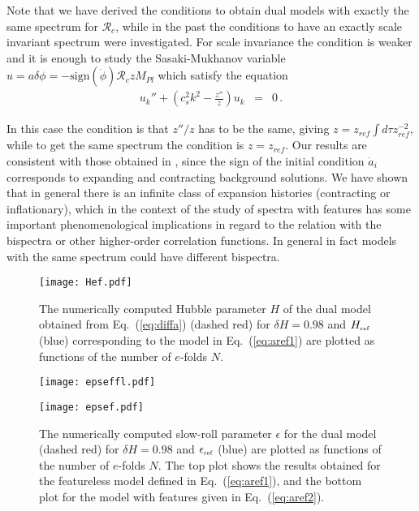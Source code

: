 \documentclass[aps,prl,amsmath,nofootinbib,twocolumn]{revtex4}
\newcommand{\3}{\partial}
\newcommand{\4}{\frac}
\newcommand{\5}{\delta}
\renewcommand\({\left(}
\renewcommand\){\right)}
\renewcommand\[{\left[}
\renewcommand\]{\right]}
\def\R{{\mathcal R}}
\newcommand{\bea}{\begin{eqnarray}}
\newcommand{\eea}{\end{eqnarray}}
\newcommand{\reff}{{\mbox{\tiny ref}}}
\newcommand{\eqn}[1]{(\ref{#1})}
\begin{document}

Note that we have derived the conditions to obtain dual models with exactly the same spectrum for $\R_c$, while in the past \cite{Wands:1998yp,Boyle:2004gv} the conditions to have an exactly scale invariant spectrum were investigated. 
For scale invariance the condition is weaker and it is enough to study the Sasaki-Mukhanov variable~\cite{Arroja:2011yu} $u=a \delta \phi=-\mbox{sign}(\dot{\phi}) \R_c z M_{Pl}$ which satisfy the equation
\bea\label{pertu}
u_k''+ \left(c_s^2 k^2-\frac{z''}{z}\right) u_k&=&0 \,.
\eea

In this case the condition is that $z''/z$ has to be the same, giving $z=z_{ref}\int d\tau z_{ref}^{-2}$, while to get the same spectrum the condition is $z=z_{ref}$. Our results are consistent with those obtained in \cite{Wands:1998yp}, since the sign of the initial condition $\dot{a}_i$  corresponds to expanding and contracting background solutions. We have shown that in general there is an infinite class of expansion histories (contracting or inflationary), which in the context of the study of spectra with features has some important phenomenological implications in regard to the relation with the bispectra or other higher-order correlation functions. In general in fact models with the same spectrum could have different bispectra.%

\begin{figure}
  \texttt{[image: Hef.pdf]}
\caption{The numerically computed Hubble parameter $H$ of the dual model obtained from Eq.~\eqn{eq:diffa} (dashed red) for $\delta H= 0.98$ and $H_\reff$ (blue) corresponding to the model in Eq.~\eqn{eq:aref1} are plotted as functions of the number of $e$-folds $N$. }
\label{fig:H}
\end{figure}

\begin{figure}
 \begin{minipage}{.45\textwidth}
  \texttt{[image: epseffl.pdf]}
  \end{minipage}
 \begin{minipage}{.45\textwidth}
  \texttt{[image: epsef.pdf]}
 \end{minipage}
  \caption{The numerically computed slow-roll parameter $\epsilon$ for the dual model (dashed red) for $\delta H=0.98$ and $\epsilon_\reff$ (blue) are plotted as functions of the number of $e$-folds $N$. The top plot shows the results obtained for the featureless model defined in Eq.~\eqn{eq:aref1}, and the bottom plot for the model with features given in Eq.~\eqn{eq:aref2}.
}
\label{fig:sreps}
\end{figure}
\end{document}
